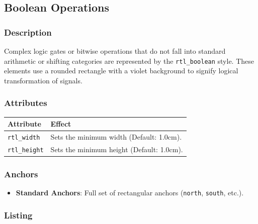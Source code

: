 \subsection{\sffamily Boolean Operations}

    \subsubsection{\sffamily Description}
        Complex logic gates or bitwise operations that do not fall into standard arithmetic or shifting categories are represented by the \texttt{rtl\_boolean} style. These elements use a rounded rectangle with a violet background to signify logical transformation of signals.

    \subsubsection{\sffamily Attributes}
    \begin{center}
        \begin{tabular}{lp{8cm}}
        \toprule
            \textbf{Attribute} & \textbf{Effect} \\
            \midrule
            \texttt{rtl\_width} & Sets the minimum width (Default: 1.0cm). \\
            \texttt{rtl\_height} & Sets the minimum height (Default: 1.0cm). \\
            \bottomrule
        \end{tabular}
    \end{center}

    \subsubsection{\sffamily Anchors}
        \begin{itemize}
            \item \textbf{Standard Anchors}: Full set of rectangular anchors (\texttt{north}, \texttt{south}, etc.).
        \end{itemize}

    \subsubsection{\sffamily Listing}
\begin{RTLexample}
\end{RTLexample}